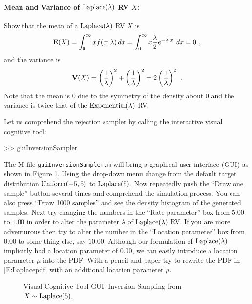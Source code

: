 \paragraph{Mean and Variance of $\mbox{{\rm Laplace}}(\lambda)$ RV $X$:}
Show that the mean of a $\mbox{{\rm Laplace}}(\lambda)$ RV $X$ is
\[
\mathbf{E}(X) = \int_{0}^{\infty} x f(x;\lambda)\,dx
=   \int_{0}^{\infty} x \frac{\lambda}{2} e^{- \lambda |x|}\,dx
= 0 \ ,
\]
and the variance is
\[
\mathbf{V}(X) = \left(  \frac{1}{\lambda} \right)^2 + \left(  \frac{1}{\lambda} \right)^2 = 2 \left(  \frac{1}{\lambda} \right)^2\ .
\]
Note that the mean is $0$ due to the symmetry of the density about $0$ and the variance is twice that of the $\mbox{{\rm Exponential}}(\lambda)$ RV.

\begin{labwork}\label{LW:guiInversionSamplerLaplace}
Let us comprehend the rejection sampler by calling the interactive visual cognitive tool:
\begin{VrbM}
>> guiInversionSampler
\end{VrbM}
The M-file {\tt guiInversionSampler.m} will bring a graphical user interface (GUI) as shown in \hyperref[F:guiInversionSamplerLaplace]{Figure \ref*{F:guiInversionSamplerLaplace}}.  Using the drop-down menu change from the default target distribution $\mbox{{\rm Uniform}}(-5,5)$ to $\mbox{{\rm Laplace}}(5)$.  Now repeatedly push the ``Draw one sample'' button several times and comprehend the simulation process.  You can also press ``Draw 1000 samples'' and see the density histogram of the generated samples.  
Next try changing the numbers in the ``Rate parameter'' box from $5.00$ to $1.00$ in order to alter the parameter $\lambda$ of $\mbox{{\rm Laplace}}(\lambda)$ RV.  If you are more adventurous then try to alter the number in the ``Location parameter'' box from $0.00$ to some thing else, say $10.00$.  Although our formulation of $\mbox{{\rm Laplace}}(\lambda)$ implicitly had a location parameter of $0.00$, we can easily introduce a location parameter $\mu$ into the PDF.  With a pencil and paper try to rewrite the PDF in \eqref{E:Laplacepdf} with an additional location parameter $\mu$.
\end{labwork}

\begin{figure}[htpb]
\caption{Visual Cognitive Tool GUI: Inversion Sampling from $X \sim \mbox{{\rm Laplace}}(5)$.\label{F:guiInversionSamplerLaplace}}
\centering   {}
\end{figure}

